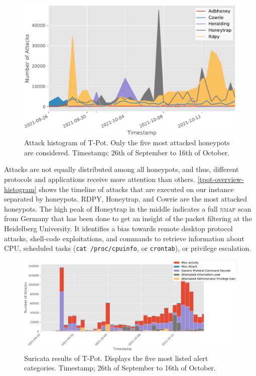 \begin{figure}
    \centering
    \includegraphics[width=\textwidth]{figures/tpot-attacks-histogram.pdf}
    \caption[Attack histogram of T-Pot]{
        Attack histogram of T-Pot.
        Only the five most attacked honeypots are considered.
        Timestamp; 26th of September to 16th of October.
    }
    \label{tpot-overview-histogram}
\end{figure}

Attacks are not equally distributed among all honeypots, and thus, different protocols and applications receive more attention than others.
\autoref{tpot-overview-histogram} shows the timeline of attacks that are executed on our instance separated by honeypots.
RDPY, Honeytrap, and Cowrie are the most attacked honeypots.
The high peak of Honeytrap in the middle indicates a full \textsc{nmap} scan from Germany that has been done to get an insight of the packet filtering at the Heidelberg University.
It identifies a bias towards remote desktop protocol attacks, shell-code exploitations, and commands to retrieve information about CPU, scheduled tasks (\verb|cat /proc/cpuinfo|, or \verb|crontab|), or privilege escalation.

\begin{figure}
    \centering
    \includegraphics[width=\textwidth]{figures/tpot-suricata-alerts.pdf}
    \caption[Suricata results of T-Pot]{
        Suricata results of T-Pot.
        Displays the five most listed alert categories.
        Timestamp; 26th of September to 16th of October.
    }
    \label{fig:suricata-results}
\end{figure}

